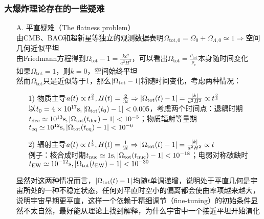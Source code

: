 \subsubsection{大爆炸理论存在的一些疑难}
\begin{itemize}
	\item[A. ] 平直疑难（The flatness problem） \\
	由CMB、BAO和超新星等独立的观测数据表明$\Omega_{\text{tot}, 0} = \Omega_{0} + \Omega_{\Lambda, 0} \simeq 1 \Rightarrow$空间几何近似平坦 \\
	由Friedmann方程得到$\Omega_{\text{tot}} - 1 = \frac{kc^2}{a^2 H^2}$，可以看出$\Omega_{\text{tot}} = \frac{\rho_{\text{tot}}}{\rho_c}$本身随时间变化 \\
	如果$\Omega_{\text{tot}} = 1$，则$k = 0$，空间始终平坦 \\
	然而$\Omega_{\text{tot}}$只是近似等于1，那么$\abs{\Omega_{\text{tot}} - 1}$将随时间变化，考虑两种情况：
	\begin{itemize}
		\item[1)] 物质主导$a(t) \propto t^{\frac{2}{3}}, H(t) = \frac{2}{3t} \Rightarrow \abs{\Omega_{\text{tot}}(t) - 1} = \frac{\abs{k}}{a^2 H^2} \propto t^{\frac{2}{3}}$ \\
		以$t_0 = 4 \times 10^{17} \mathrm{s}, \abs{\Omega_{\text{tot}}(t_0) - 1} < 0.005$，考虑两个时间点：退耦时期$t_{\text{dec}} \simeq 10^{13} \mathrm{s}, \abs{\Omega_{\text{tot}}(t_{\text{dec}}) - 1} < 10^{-5}$；物质辐射等量期$t_{\text{eq}} \simeq 10^{12} \mathrm{s}, \abs{\Omega_{\text{tot}}(t_{\text{eq}}) - 1} < 10^{-6}$
		\item[2)] 辐射主导$a(t) \propto t^{\frac{1}{2}}, H(t) = \frac{1}{2t} \Rightarrow \abs{\Omega_{\text{tot}}(t) - 1} = \frac{\abs{k}}{a^2 H^2} \propto t$ \\
		例子：核合成时期$t_{\text{nuc}} \simeq 1 \mathrm{s}, \abs{\Omega_{\text{tot}}(t_{\text{nuc}}) - 1} < 10^{-18}$；电弱对称破缺时$t_{\text{EW}} \simeq 10^{-12} \mathrm{s}, \abs{\Omega_{\text{tot}}(t_{\text{EW}}) - 1} < 10^{-30}$
	\end{itemize}
	显然对这两种情况而言，$\abs{\Omega_{\text{tot}}(t) - 1}$均随$t$单调递增，说明处于平直几何是宇宙所处的一种不稳定状态，任何对平直时空小的偏离都会使曲率项越来越大，说明宇宙早期更平直，这样一个依赖于精细调节（fine-tuning）的初始条件显然不太自然，最好能从理论上找到解释，为什么宇宙中一个接近平坦开始演化
	

\end{itemize}
